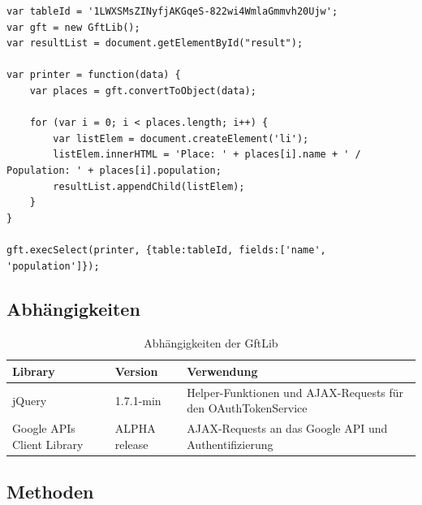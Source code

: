 \lstset{language=JavaScript}
\begin{lstlisting}[caption=Verwendung der GftLib, label=gftlib-example]
var tableId = '1LWXSMsZINyfjAKGqeS-822wi4WmlaGmmvh20Ujw';
var gft = new GftLib();
var resultList = document.getElementById("result");

var printer = function(data) {
	var places = gft.convertToObject(data);

	for (var i = 0; i < places.length; i++) {
		var listElem = document.createElement('li');
		listElem.innerHTML = 'Place: ' + places[i].name + ' / Population: ' + places[i].population;
		resultList.appendChild(listElem);
	}
}

gft.execSelect(printer, {table:tableId, fields:['name', 'population']});
\end{lstlisting}

\subsection{Abhängigkeiten}
\begin{table}[H]
\centering
\begin{tabular}{|p{0.3\threecelltabwidth}|p{0.2\threecelltabwidth}|p{0.5\threecelltabwidth}|}
\hline 
\textbf{Library} & \textbf{Version} & \textbf{Verwendung} \\ 
\hline 
jQuery & 1.7.1-min & Helper-Funktionen und \gls{AJAX}-Requests für den OAuthTokenService  \\ 
\hline 
Google \gls{API}s Client Library & ALPHA release & \gls{AJAX}-Requests an das Google \gls{API} und Authentifizierung \\ 
\hline 
\end{tabular} 
\caption{Abhängigkeiten der GftLib}
\end{table}

\subsection{Methoden}
